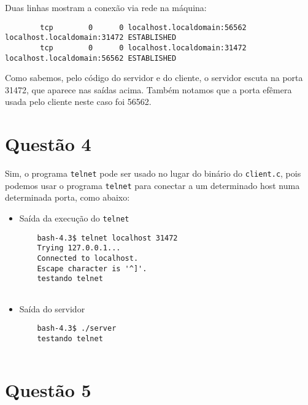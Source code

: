 \documentclass[a4paper,10pt]{article}
\begin{document}
    Duas linhas mostram a conexão via rede na máquina:
    
    \begin{lstlisting}
        tcp        0      0 localhost.localdomain:56562 localhost.localdomain:31472 ESTABLISHED
        tcp        0      0 localhost.localdomain:31472 localhost.localdomain:56562 ESTABLISHED
    \end{lstlisting}
    
    Como sabemos, pelo código do servidor e do cliente, o servidor escuta na porta 31472, que aparece nas saídas acima. Também notamos que a porta efêmera usada pelo cliente neste caso foi 56562.

\section{Questão 4}
    Sim, o programa {\tt telnet} pode ser usado no lugar do binário do {\tt client.c}, pois podemos usar o programa {\tt telnet} para conectar a um determinado host numa determinada porta, como abaixo:
    
    \begin{itemize}
        \item Saída da execução do {\tt telnet}
            \begin{lstlisting}
    bash-4.3$ telnet localhost 31472
    Trying 127.0.0.1...
    Connected to localhost.
    Escape character is '^]'.
    testando telnet
        
            \end{lstlisting}
    
        \item Saída do servidor
            \begin{lstlisting}
    bash-4.3$ ./server 
    testando telnet
    
            \end{lstlisting}
    \end{itemize}

\section{Questão 5}
\end{document}
